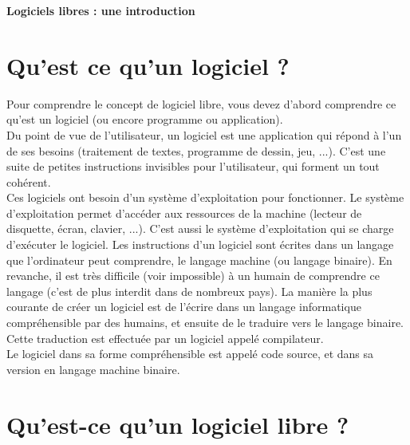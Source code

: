 \documentclass{article}
\begin{document}
\begin{center}
    \fontsize{28}{24}
    \textbf{Logiciels libres : une introduction}
\end{center}
\vspace{10mm}

\tableofcontents
\newpage

\fontsize{12}{14}
\vspace{10mm}
\justifying

\section{Qu'est ce qu'un logiciel ?} 

Pour comprendre le concept de logiciel libre, vous devez d'abord comprendre ce qu'est un logiciel (ou encore programme ou application). \vspace{5mm} \\
Du point de vue de l'utilisateur, un logiciel est une application qui répond à l'un de ses besoins (traitement de textes, programme de dessin, jeu, ...). C'est une suite de petites instructions invisibles pour l'utilisateur, qui forment un tout cohérent. \vspace{5mm} \\
Ces logiciels ont besoin d'un système d'exploitation pour fonctionner. Le système d'exploitation permet d'accéder aux ressources de la machine (lecteur de disquette, écran, clavier, ...). C'est aussi le système d'exploitation qui se charge d'exécuter le logiciel. \vspace{5mm} 
Les instructions d'un logiciel sont écrites dans un langage que l'ordinateur peut comprendre, le langage machine (ou langage binaire). En revanche, il est très difficile (voir impossible) à un humain de comprendre ce langage (c'est de plus interdit dans de nombreux pays). La manière la plus courante de créer un logiciel est de l'écrire dans un langage informatique compréhensible par des humains, et ensuite de le traduire vers le langage binaire. Cette traduction est effectuée par un logiciel appelé compilateur. \vspace{5mm} \\
Le logiciel dans sa forme compréhensible est appelé code source, et dans sa version en langage machine binaire.

\section{Qu'est-ce qu'un logiciel libre ?}
\end{document}
